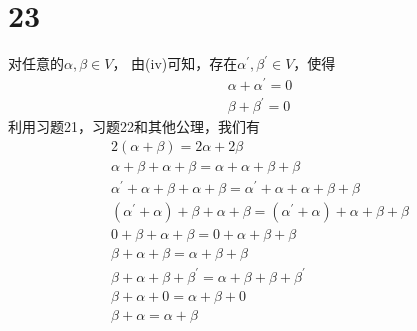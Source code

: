 \documentclass{article}
\begin{document}
\section*{23}

对任意的$\alpha, \beta \in V$，
由(iv)可知，存在$\alpha^\prime, \beta^\prime \in V$，使得
\begin{align*}
  \alpha + \alpha^\prime = 0 \\
  \beta + \beta^\prime = 0
\end{align*}
利用习题21，习题22和其他公理，我们有
\begin{align*}
  2(\alpha + \beta) = 2\alpha + 2\beta                                                                  \\
  \alpha + \beta + \alpha + \beta = \alpha + \alpha + \beta + \beta                                     \\
  \alpha^\prime + \alpha + \beta + \alpha + \beta = \alpha^\prime + \alpha + \alpha + \beta + \beta     \\
  (\alpha^\prime + \alpha) + \beta + \alpha + \beta = (\alpha^\prime + \alpha) + \alpha + \beta + \beta \\
  0 + \beta + \alpha + \beta = 0 + \alpha + \beta + \beta                                               \\
  \beta + \alpha + \beta = \alpha + \beta + \beta                                                       \\
  \beta + \alpha + \beta + \beta^\prime = \alpha + \beta + \beta + \beta^\prime                         \\
  \beta + \alpha + 0 = \alpha + \beta + 0                                                               \\
  \beta + \alpha = \alpha + \beta
\end{align*}
\end{document}
